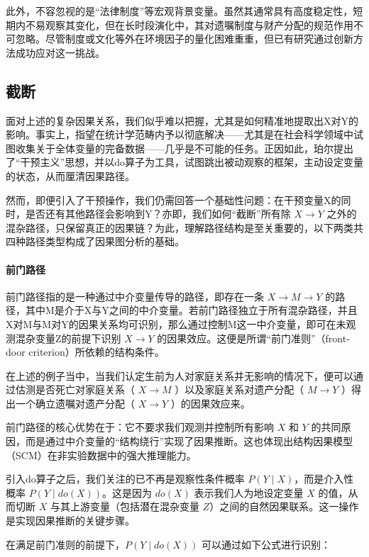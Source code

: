 此外，不容忽视的是“法律制度”等宏观背景变量。虽然其通常具有高度稳定性，短期内不易观察其变化，但在长时段演化中，其对遗嘱制度与财产分配的规范作用不可忽略。尽管制度或文化等外在环境因子的量化困难重重，但已有研究通过创新方法成功应对这一挑战。

\subsection{截断}

面对上述的复杂因果关系，我们似乎难以把握，尤其是如何精准地提取出X对Y的影响。事实上，指望在统计学范畴内予以彻底解决——尤其是在社会科学领域中试图收集关于全体变量的完备数据——几乎是不可能的任务。正因如此，珀尔提出了“干预主义”思想，并以do算子为工具，试图跳出被动观察的框架，主动设定变量的状态，从而厘清因果路径。

然而，即便引入了干预操作，我们仍需回答一个基础性问题：在干预变量X的同时，是否还有其他路径会影响到Y？亦即，我们如何“截断”所有除 $X \rightarrow Y$ 之外的混杂路径，只保留真正的因果链？为此，理解路径结构是至关重要的，以下两类共四种路径类型构成了因果图分析的基础。

\paragraph*{前门路径}

前门路径指的是一种通过中介变量传导的路径，即存在一条 $X \rightarrow M \rightarrow Y$ 的路径，其中M是介于X与Y之间的中介变量。若前门路径独立于所有混杂路径，并且X对M与M对Y的因果关系均可识别，那么通过控制M这一中介变量，即可在未观测混杂变量Z的前提下识别 $X \rightarrow Y$ 的因果效应。这便是所谓“前门准则”（front-door criterion）所依赖的结构条件。

在上述的例子当中，当我们认定生前为人对家庭关系并无影响的情况下，便可以通过估测是否死亡对家庭关系（ $X \rightarrow M$ ）以及家庭关系对遗产分配（ $M \rightarrow Y$ ）得出一个确立遗嘱对遗产分配（ $X \rightarrow Y$ ）的因果效应来。

前门路径的核心优势在于：它不要求我们观测并控制所有影响 $X$ 和 $Y$ 的共同原因，而是通过中介变量的“结构绕行”实现了因果推断。这也体现出结构因果模型（SCM）在非实验数据中的强大推理能力。

引入do算子之后，我们关注的已不再是观察性条件概率 $P(Y \mid X)$，而是介入性概率 $P(Y \mid do(X))$。这是因为 $do(X)$ 表示我们人为地设定变量 $X$ 的值，从而切断 $X$ 与其上游变量（包括潜在混杂变量 $Z$）之间的自然因果联系。这一操作是实现因果推断的关键步骤。

在满足前门准则的前提下，$P(Y \mid do(X))$ 可以通过如下公式进行识别：

